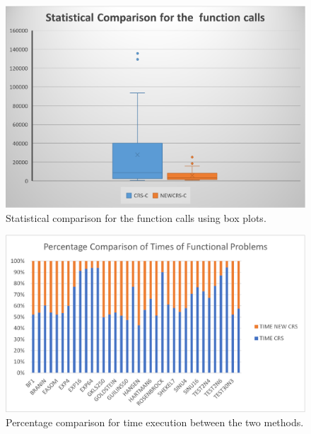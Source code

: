 \documentclass[symmetry,article,submit,moreauthors,pdftex]{mdpi}
\begin{document}
\begin{figure}
\caption{Statistical comparison for the function calls using box plots.\\ \label{fig:Statistical-comparison-for}}

\begin{centering}
\includegraphics[scale=0.7]{values}
\par\end{centering}
\end{figure}


\begin{figure}
\caption{Percentage comparison for time execution between the two methods.\\ \label{fig:TimeComparisonPercentage}}

\begin{centering}
\includegraphics[scale=0.7]{graph_time}
\par\end{centering}
\end{figure}
\end{document}
